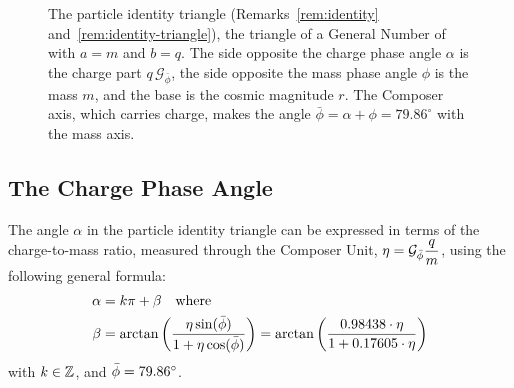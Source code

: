 \begin{figure}[tb]
\myfloatalign
{}
\caption[The particle identity triangle]{The particle identity triangle (Remarks~\ref{rem:identity} and~\ref{rem:identity-triangle}), the triangle of a General Number of  with $a = m$ and $b = q$. The side opposite the charge phase angle $\alpha$ is the charge part $q\,\mathcal{G}_{\bar{\phi}}$, the side opposite the mass phase angle $\phi$ is the mass $m$, and the base is the cosmic magnitude $r$. The Composer axis, which carries charge, makes the angle $\bar{\phi} = \alpha + \phi = 79.86^\circ$ with the mass axis.}
\label{fig:particle-triangle}
\end{figure}

\subsection{The Charge Phase Angle}\label{subsec:id-phase}

\begin{remark}\label{rem:charge-phase}
The angle $\alpha$ in the particle identity triangle can be expressed in terms of the charge-to-mass ratio, measured through the Composer Unit, $\eta = \mathcal{G}_{\bar{\phi}}\dfrac{q}{m}$, using the following general formula:
\begin{align*}
\alpha &= k\pi + \beta \quad \text{where} \\
\beta &= \arctan\left(\frac{\eta\sin(\bar{\phi})}{1 + \eta\cos(\bar{\phi})}\right) = \arctan\left(\frac{0.98438 \cdot \eta}{1 + 0.17605 \cdot \eta}\right)
\end{align*}
with $k \in \mathbb{Z}$, and $\bar{\phi} = 79.86^\circ$.
\end{remark}


